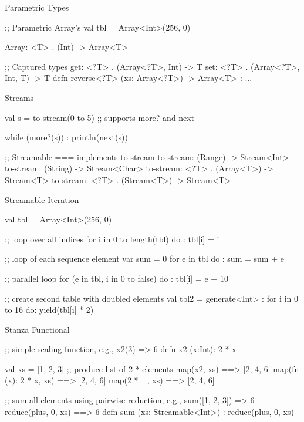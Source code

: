 \begin{frame}[fragile]{Parametric Types}
\begin{stanza}
;; Parametric Array's
val tbl = Array<Int>(256, 0)

Array: <T> . (Int) -> Array<T>

;; Captured types
get: <?T> . (Array<?T>, Int) -> T
set: <?T> . (Array<?T>, Int, T) -> T
defn reverse<?T> (xs: Array<?T>) -> Array<T> : ...
\end{stanza}
\end{frame}

\begin{frame}[fragile]{Streams}
\begin{stanza}
val s = to-stream(0 to 5)
;; supports more? and next

while (more?(s)) :
println(next(s))

;; Streamable === implements to-stream
to-stream: (Range) -> Stream<Int>
to-stream: (String) -> Stream<Char>
to-stream: <?T> . (Array<T>) -> Stream<T>
to-stream: <?T> . (Stream<T>) -> Stream<T>
\end{stanza}
\end{frame}

\begin{frame}[fragile]{Streamable Iteration}
\begin{stanza}
val tbl = Array<Int>(256, 0)

;; loop over all indices
for i in 0 to length(tbl) do :
  tbl[i] = i

;; loop of each sequence element
var sum = 0
for e in tbl do :
  sum = sum + e

;; parallel loop
for (e in tbl, i in 0 to false) do :
  tbl[i] = e + 10

;; create second table with doubled elements
val tbl2 = generate<Int> :
  for i in 0 to 16 do: yield(tbl[i] * 2)
\end{stanza}
\end{frame}

\begin{frame}[fragile]{Stanza Functional}
\begin{stanza}
;; simple scaling function, e.g., x2(3) => 6
defn x2 (x:Int): 2 * x
\end{stanza}

\begin{stanza}
val xs = [1, 2, 3]
;; produce list of 2 * elements
map(x2, xs)            ==> [2, 4, 6]
map(fn (x): 2 * x, xs) ==> [2, 4, 6]
map({2 * _}, xs)       ==> [2, 4, 6]
\end{stanza}

\begin{stanza}
;; sum all elements using pairwise reduction, e.g., sum([1, 2, 3]) => 6
reduce(plus, 0, xs) ==> 6
defn sum (xs: Streamable<Int>) : reduce(plus, 0, xs)
\end{stanza}
\end{frame}

